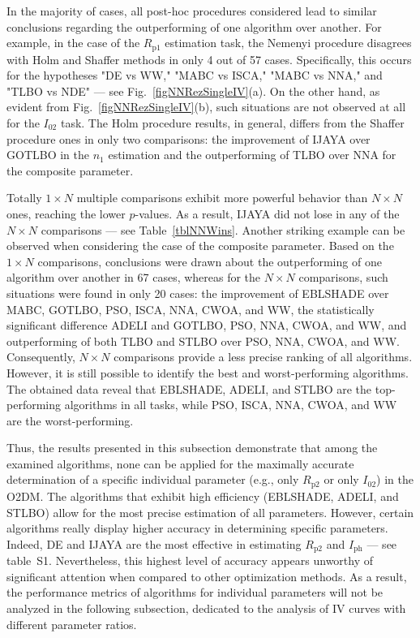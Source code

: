 \documentclass[a4paper,fleqn]{cas-dc}
\begin{document}
In the majority of cases, all post-hoc procedures considered lead to similar conclusions regarding the outperforming of one algorithm over another.
For example, in the case of the $R_\mathrm{p1}$ estimation task,
the Nemenyi procedure disagrees with Holm and Shaffer methods in only 4 out of 57 cases.
Specifically, this occurs for the hypotheses "DE vs WW," "MABC vs ISCA," "MABC vs NNA," and "TLBO vs NDE" --- see Fig.~\ref{figNNRezSingleIV}(a).
On the other hand, as evident from Fig.~\ref{figNNRezSingleIV}(b), such situations are not observed at all for the $I_{02}$ task.
The Holm procedure results, in general, differs from the Shaffer procedure ones in only two comparisons:
the improvement of IJAYA over GOTLBO in the $n_1$ estimation and the outperforming of TLBO over NNA for the composite parameter.

Totally $1\times N$ multiple comparisons exhibit more powerful behavior than $N\times N$ ones, reaching the lower $p$-values.
As a result, IJAYA did not lose in any of the $N\times N$ comparisons --- see Table~\ref{tblNNWins}.
Another striking  example can be observed when considering the case of the composite parameter.
Based on the $1\times N$ comparisons, conclusions were drawn about the outperforming of one algorithm over another in 67 cases,
whereas for the $N\times N$ comparisons, such situations were found in only 20 cases:
the improvement of EBLSHADE over MABC, GOTLBO, PSO, ISCA, NNA, CWOA, and WW,
the statistically significant difference ADELI and GOTLBO, PSO, NNA, CWOA, and WW,
and outperforming of both TLBO and STLBO over PSO, NNA, CWOA, and WW.
Consequently, $N\times N$ comparisons provide a less precise ranking of all algorithms.
However, it is still possible to identify the best and worst-performing algorithms.
The obtained data reveal that EBLSHADE, ADELI, and STLBO are the top-performing algorithms in all tasks,
while PSO, ISCA, NNA, CWOA, and WW are the worst-performing.

Thus, the results presented in this subsection demonstrate that
among the examined algorithms, none can be applied for the maximally accurate determination
of a specific individual parameter (e.g., only $R_\mathrm{p2}$ or only $I_{02}$) in the O2DM.
The algorithms that exhibit high efficiency (EBLSHADE, ADELI, and STLBO) allow for the most precise estimation of all parameters.
However, certain algorithms really display higher accuracy in determining specific parameters.
Indeed, DE and IJAYA are the most effective in estimating $R_\mathrm{p2}$ and $I_\mathrm{ph}$ --- see table~S1.
Nevertheless, this highest level of accuracy appears unworthy of significant attention when compared to other optimization methods.
As a result, the performance metrics of algorithms for individual parameters will not be analyzed
in the following subsection, dedicated to the analysis of IV curves with different parameter ratios.
\end{document}
